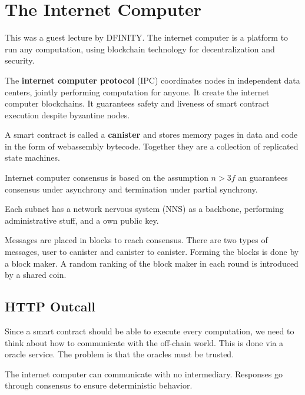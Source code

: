 \section{The Internet Computer}

This was a guest lecture by DFINITY. The internet computer is a platform to run any computation, using blockchain technology for decentralization and security.\medskip

The \textbf{internet computer protocol} (IPC) coordinates nodes in independent data centers, jointly performing computation for anyone. It create the internet computer blockchains. It guarantees safety and liveness of smart contract execution despite byzantine nodes. \medskip

A smart contract is called a \textbf{canister} and stores memory pages in data and code in the form of webassembly bytecode. Together they are a collection of replicated state machines. \medskip

Internet computer consensus is based on the assumption $n > 3f$ an guarantees consensus under asynchrony and termination under partial synchrony. \medskip

Each subnet has a network nervous system (NNS) as a backbone, performing administrative stuff, and a own public key. \medskip

Messages are placed in blocks to reach consensus. There are two types of messages, user to canister and canister to canister. Forming the blocks is done by a block maker. A random ranking of the block maker in each round is introduced by a shared coin. \medskip

\subsection{HTTP Outcall}

Since a smart contract should be able to execute every computation, we need to think about how to communicate with the off-chain world. This is done via a oracle service. The problem is that the oracles must be trusted. \medskip

The internet computer can communicate with no intermediary. Responses go through consensus to ensure deterministic behavior. 
